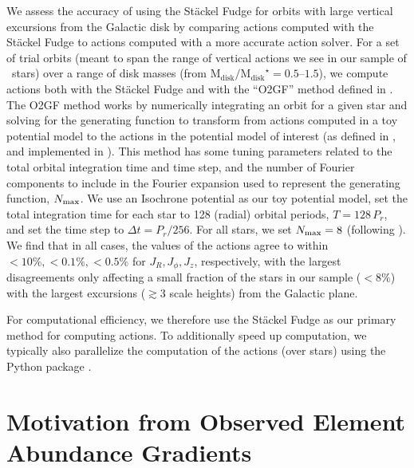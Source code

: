 \documentclass[modern]{aastex63}
\newcommand{\apogee}{\acronym{APOGEE}}
\newcommand{\mdisk}{\ensuremath{\mathrm{M}_\mathrm{disk}}}
\newcommand{\mratio}{\ensuremath{\mdisk / \mdisk^\star}}
\begin{document}
We assess the accuracy of using the St\"ackel Fudge for orbits with large
vertical excursions from the Galactic disk by comparing actions computed with
the St\"ackel Fudge to actions computed with a more accurate action solver.
For a set of trial orbits (meant to span the range of vertical actions we see in
our sample of \apogee\ stars) over a range of disk masses (from
$\mratio=0.5$--$1.5$), we compute actions both with the St\"ackel Fudge and with
the ``O2GF'' method defined in \citet{Sanders:2014, Sanders:2016}.
The O2GF method works by numerically integrating an orbit for a given star and
solving for the generating function to transform from actions computed in a toy
potential model to the actions in the potential model of interest (as defined in
\citealt{Sanders:2014}, and implemented in ).
This method has some tuning parameters related to the total orbital integration
time and time step, and the number of Fourier components to include in the
Fourier expansion used to represent the generating function, $N_{\rm max}$.
We use an Isochrone potential as our toy potential model, set the total
integration time for each star to 128 (radial) orbital periods, $T=128\,P_r$,
and set the time step to $\Delta t = P_r / 256$. For all stars, we set $N_{\rm
max} = 8$ (following \citealt{Sanders:2016}).
We find that in all cases, the values of the actions agree to within $<10\%,
<0.1\%, <0.5\%$ for $J_R, J_\phi, J_z$, respectively, with the largest
disagreements only affecting a small fraction of the stars in our sample
($<8\%$) with the largest excursions ($\gtrsim 3$ scale heights) from the
Galactic plane.

For computational efficiency, we therefore use the St\"ackel Fudge as our
primary method for computing actions.
To additionally speed up computation, we typically also parallelize the
computation of the actions (over stars) using the Python package
 \citep{schwimmbad}.


\section{Motivation from Observed Element Abundance Gradients}
\label{sec:motivation}
\end{document}
